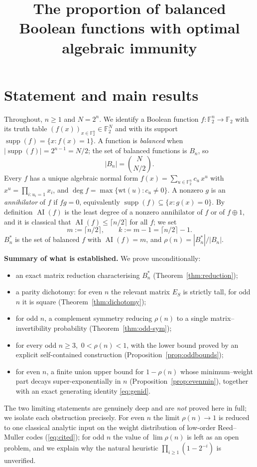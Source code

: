 \documentclass{amsart}
\theoremstyle{definition}
\DeclareMathOperator{\AI}{AI}
\DeclareMathOperator{\supp}{supp}
\newcommand{\F}{\mathbb{F}}
\begin{document}
\title{The proportion of balanced Boolean functions with optimal algebraic immunity}
\maketitle

\section{Statement and main results}

Throughout, $n\ge 1$ and $N=2^{n}$. We identify a Boolean function
$f:\F_2^n\to\F_2$ with its truth table $(f(x))_{x\in\F_2^n}\in\F_2^{N}$
and with its support $\supp(f)=\{x: f(x)=1\}$. A function is
\emph{balanced} when $|\supp(f)|=2^{n-1}=N/2$; the set of balanced
functions is $B_n$, so
\begin{equation}\label{eq:Bn}
|B_n|=\binom{N}{N/2}.
\end{equation}
Every $f$ has a unique algebraic normal form
$f(x)=\sum_{u\in\F_2^n}c_u\,x^{u}$ with $x^{u}=\prod_{i:u_i=1}x_i$, and
$\deg f=\max\{\mathrm{wt}(u):c_u\ne0\}$. A nonzero $g$ is an
\emph{annihilator} of $f$ if $fg=0$, equivalently
$\supp(f)\subseteq\{x:g(x)=0\}$. By definition $\AI(f)$ is the least
degree of a nonzero annihilator of $f$ or of $f\oplus 1$, and it is
classical that $\AI(f)\le\lceil n/2\rceil$ for all $f$; we set
\[
m:=\lceil n/2\rceil,\qquad k:=m-1=\lceil n/2\rceil-1 .
\]
$B_n^*$ is the set of balanced $f$ with $\AI(f)=m$, and
$\rho(n)=|B_n^*|/|B_n|$.

\medskip
\noindent\textbf{Summary of what is established.}
We prove unconditionally:
\begin{itemize}
\item an exact matrix reduction characterising $B_n^*$
      (Theorem~\ref{thm:reduction});
\item a parity dichotomy: for even $n$ the relevant matrix $E_S$ is
      strictly tall, for odd $n$ it is square
      (Theorem~\ref{thm:dichotomy});
\item for odd $n$, a complement symmetry reducing $\rho(n)$ to a single
      matrix--invertibility probability (Theorem~\ref{thm:odd-sym});
\item for every odd $n\ge3$, $\,0<\rho(n)<1$, with the lower bound proved
      by an explicit self-contained construction
      (Proposition~\ref{prop:oddbounds});
\item for even $n$, a finite union upper bound for $1-\rho(n)$ whose
      minimum--weight part decays super-exponentially in $n$
      (Proposition~\ref{prop:evenmin}), together with an exact generating
      identity \eqref{eq:genid}.
\end{itemize}
The two limiting statements are genuinely deep and are \emph{not} proved
here in full; we isolate each obstruction precisely. For even $n$ the
limit $\rho(n)\to1$ is reduced to one classical analytic input on the
weight distribution of low-order Reed--Muller codes
(\eqref{eq:cited}); for odd $n$ the value of $\lim\rho(n)$ is left as an
open problem, and we explain why the natural heuristic
$\prod_{i\ge1}(1-2^{-i})$ is unverified.
\end{document}
